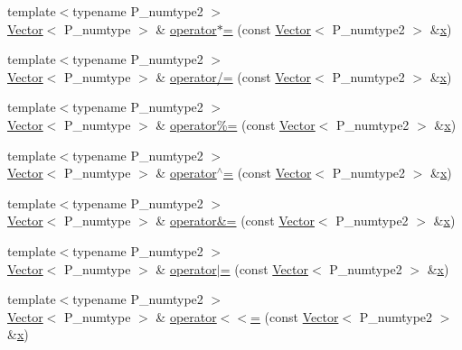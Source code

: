 \begin{DoxyCompactItemize}
\item 
{\footnotesize template$<$typename P\+\_\+numtype2 $>$ }\\\hyperlink{classVector}{Vector}$<$ P\+\_\+numtype $>$ \& \hyperlink{classVector_aacde51f57393b01e66f346d7394329e0}{operator$\ast$=} (const \hyperlink{classVector}{Vector}$<$ P\+\_\+numtype2 $>$ \&\hyperlink{vecnorm1_8cc_ac73eed9e41ec09d58f112f06c2d6cb63}{x})
\item 
{\footnotesize template$<$typename P\+\_\+numtype2 $>$ }\\\hyperlink{classVector}{Vector}$<$ P\+\_\+numtype $>$ \& \hyperlink{classVector_a807c1267bf7176b437de6b680e3f3283}{operator/=} (const \hyperlink{classVector}{Vector}$<$ P\+\_\+numtype2 $>$ \&\hyperlink{vecnorm1_8cc_ac73eed9e41ec09d58f112f06c2d6cb63}{x})
\item 
{\footnotesize template$<$typename P\+\_\+numtype2 $>$ }\\\hyperlink{classVector}{Vector}$<$ P\+\_\+numtype $>$ \& \hyperlink{classVector_a49706b5e8ea375004dbcc403e8cbd161}{operator\%=} (const \hyperlink{classVector}{Vector}$<$ P\+\_\+numtype2 $>$ \&\hyperlink{vecnorm1_8cc_ac73eed9e41ec09d58f112f06c2d6cb63}{x})
\item 
{\footnotesize template$<$typename P\+\_\+numtype2 $>$ }\\\hyperlink{classVector}{Vector}$<$ P\+\_\+numtype $>$ \& \hyperlink{classVector_a7cd14d86f04d74b6ffbb58db8cb386f8}{operator$^\wedge$=} (const \hyperlink{classVector}{Vector}$<$ P\+\_\+numtype2 $>$ \&\hyperlink{vecnorm1_8cc_ac73eed9e41ec09d58f112f06c2d6cb63}{x})
\item 
{\footnotesize template$<$typename P\+\_\+numtype2 $>$ }\\\hyperlink{classVector}{Vector}$<$ P\+\_\+numtype $>$ \& \hyperlink{classVector_a310ee6eeaaf6cbd4d8e3359d2f83234b}{operator\&=} (const \hyperlink{classVector}{Vector}$<$ P\+\_\+numtype2 $>$ \&\hyperlink{vecnorm1_8cc_ac73eed9e41ec09d58f112f06c2d6cb63}{x})
\item 
{\footnotesize template$<$typename P\+\_\+numtype2 $>$ }\\\hyperlink{classVector}{Vector}$<$ P\+\_\+numtype $>$ \& \hyperlink{classVector_a1e1651ad74e5148dc601e549e2cc5113}{operator$\vert$=} (const \hyperlink{classVector}{Vector}$<$ P\+\_\+numtype2 $>$ \&\hyperlink{vecnorm1_8cc_ac73eed9e41ec09d58f112f06c2d6cb63}{x})
\item 
{\footnotesize template$<$typename P\+\_\+numtype2 $>$ }\\\hyperlink{classVector}{Vector}$<$ P\+\_\+numtype $>$ \& \hyperlink{classVector_aed242c53d3cdbd17157888daf9b60fde}{operator$<$$<$=} (const \hyperlink{classVector}{Vector}$<$ P\+\_\+numtype2 $>$ \&\hyperlink{vecnorm1_8cc_ac73eed9e41ec09d58f112f06c2d6cb63}{x})

\end{DoxyCompactItemize}
